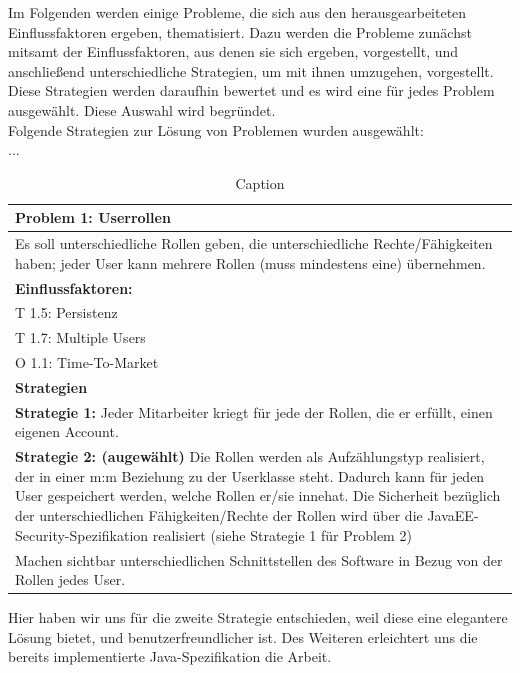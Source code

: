 \documentclass[enabledeprecatedfontcommands,fontsize=12pt,paper=a4,twoside]{scrartcl}
\begin{document}
Im Folgenden werden einige Probleme, die sich aus den herausgearbeiteten Einflussfaktoren ergeben, thematisiert. Dazu werden die Probleme zunächst mitsamt der Einflussfaktoren, aus denen sie sich ergeben, vorgestellt, und anschließend unterschiedliche Strategien, um mit ihnen umzugehen, vorgestellt. \\ 
Diese Strategien werden daraufhin bewertet und es wird eine für jedes Problem ausgewählt. Diese Auswahl wird begründet. \\ 
Folgende Strategien zur Lösung von Problemen wurden ausgewählt: \\
...


\begin{table}[]
    \centering
    \begin{tabular}{|p{15cm}|}
    \hline
          \textbf{Problem 1:} Userrollen \\ \hline
          Es soll unterschiedliche Rollen geben, die unterschiedliche Rechte/Fähigkeiten haben; jeder User kann mehrere Rollen (muss mindestens eine) übernehmen. \\ \hline
          \textbf{Einflussfaktoren: } \\
          T 1.5: Persistenz \\
          T 1.7: Multiple Users\\
          O 1.1: Time-To-Market \\
          \hline
          \textbf{Strategien} \\ \hline
          \textbf{Strategie 1:} Jeder Mitarbeiter kriegt für jede der Rollen, die er erfüllt, einen eigenen Account. \\
          \textbf{Strategie 2: (augewählt)} Die Rollen werden als Aufzählungstyp realisiert, der in einer m:m Beziehung zu der Userklasse steht. Dadurch kann für jeden User gespeichert werden, welche Rollen er/sie innehat. Die Sicherheit bezüglich der unterschiedlichen Fähigkeiten/Rechte der Rollen wird über die JavaEE-Security-Spezifikation realisiert (siehe Strategie 1 für Problem 2)\\
          Machen sichtbar unterschiedlichen Schnittstellen des Software in Bezug von der Rollen jedes User. \\ \hline
    \end{tabular}

    \caption{Caption}
    \label{tab:my_label}
\end{table}
Hier haben wir uns für die zweite Strategie entschieden, weil diese eine elegantere Lösung bietet, und benutzerfreundlicher ist. Des Weiteren erleichtert uns die bereits implementierte Java-Spezifikation die Arbeit. \\
\end{document}
